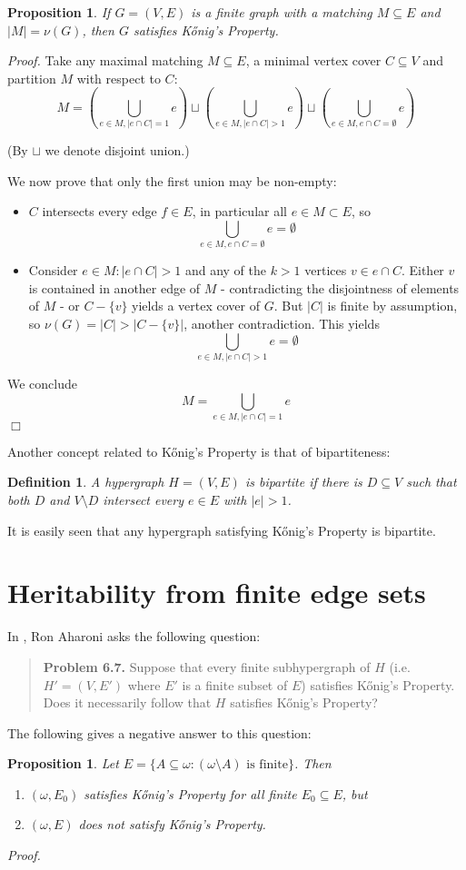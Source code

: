 \documentclass[12pt]{amsart}
\newtheorem{definition}[lemma]{\bf Definition}
\newtheorem{proposition}[lemma]{\bf Proposition}
\newcommand{\proofend}{{\hfill $\Box$}}
\begin{document}
\begin{proposition} If $G = (V,E)$ is a finite graph with a matching $M\subseteq E$
and $|M| = \nu(G)$, then $G$ satisfies K\H{o}nig's Property.
\end{proposition}
{\em Proof.} Take any maximal matching $M \subseteq E$, a minimal vertex cover $C \subseteq V$ and partition $M$ with respect to $C$:
\[M=(\bigcup_{e \in M, |e \cap C|=1} e)\sqcup (\bigcup_{e \in M, |e \cap C|>1} e) \sqcup (\bigcup_{e \in M, e \cap C= \emptyset} e)\]

(By $\sqcup$ we denote disjoint union.) 

We now prove that only the first union may be non-empty:
\begin{itemize}
    \item $C$ intersects every edge $f \in E$, in particular all $e \in M \subset E$, so \[\bigcup_{e \in M, e \cap C= \emptyset} e = \emptyset\]
    \item Consider $e \in M: |e \cap C|>1$ and any of the $k>1$ vertices $v \in e \cap C$. Either $v$ is contained in another edge of $M$ - contradicting the disjointness of elements of $M$ -  or $C -\{v\}$ yields a vertex cover of $G$. But $|C|$ is finite by assumption, so $\nu(G)=|C|>|C-\{v\}|$, another contradiction. This yields \[\bigcup_{e \in M, |e \cap C|>1} e = \emptyset\]
\end{itemize}
We conclude
\[M=\bigcup_{e \in M, |e \cap C|=1} e\]
\proofend

Another concept related to K\H{o}nig's Property is that of bipartiteness:
\begin{definition} {\em A hypergraph $H = (V,E)$  is {\em bipartite}
if there is $D\subseteq V$ such that 
both $D$ and $V\setminus D$ intersect every $e\in E$ with $|e|>1$.
}
\end{definition}

It is easily seen that any hypergraph satisfying K\H{o}nig's Property
is bipartite.


\section{Heritability from finite edge sets}
In \cite{Ah}, Ron Aharoni asks the following question:
\begin{quote}
{\bf Problem 6.7.} Suppose that every finite
subhypergraph of $H$ (i.e. $H' = (V, E')$
where $E'$ is a finite subset of $E$) satisfies
K\H{o}nig's Property. Does it necessarily follow
that $H$ satisfies K\H{o}nig's Property?
\end{quote}
The following gives a negative answer to this question:
\begin{proposition}\label{prop_one}
Let $E = \{A\subseteq \omega: (\omega \setminus A) \text{ is
finite}\}$. Then
\begin{enumerate}
\item $(\omega, E_0)$ satisfies K\H{o}nig's Property
for all finite $E_0\subseteq E$, but
\item $(\omega, E)$ does not satisfy K\H{o}nig's Property.
\end{enumerate}
\end{proposition}
{\em Proof.}
\end{document}
